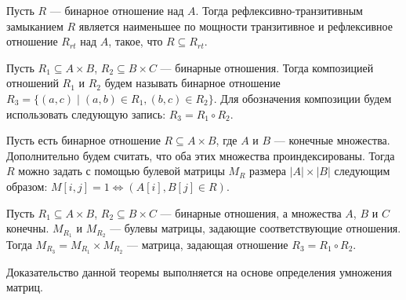 \begin{definition}
    Пусть $R$ --- бинарное отношение над $A$.
    Тогда рефлексивно-транзитивным замыканием $R$ является наименьшее по мощности транзитивное и рефлексивное отношение $R_{rt}$ над $A$, такое, что $R \subseteq R_{rt}$.
\end{definition}

\begin{definition}
    Пусть $R_1 \subseteq A \times B$, $R_2 \subseteq B \times C$ --- бинарные отношения.
    Тогда композицией отношений $R_1$ и $R_2$ будем называть бинарное отношение $R_3 = \{ (a,c) \mid (a,b) \in R_1 , (b,c) \in R_2\}$.
    Для обозначения композиции будем использовать следующую запись: $R_3 = R_1 \circ R_2$.
\end{definition}

Пусть есть бинарное отношение $R \subseteq A \times B$, где $A$ и $B$ --- конечные множества.
Дополнительно будем считать, что оба этих множества проиндексированы.
Тогда $R$ можно задать с помощью булевой матрицы $M_R$ размера $|A|\times|B|$ следующим образом: $M[i,j] = 1 \iff (A[i],B[j] \in R)$.

\begin{theorem}
    Пусть $R_1 \subseteq A \times B$, $R_2 \subseteq B \times C$ --- бинарные отношения, а множества $A$, $B$ и $C$ конечны.
    $M_{R_1}$ и $M_{R_2}$ --- булевы матрицы, задающие соответствующие отношения.
    Тогда $M_{R_3} = M_{R_1} \times M_{R_2}$ --- матрица, задающая отношение $R_3 = R_1 \circ R_2$.
\end{theorem}

Доказательство данной теоремы выполняется на основе определения умножения матриц.
